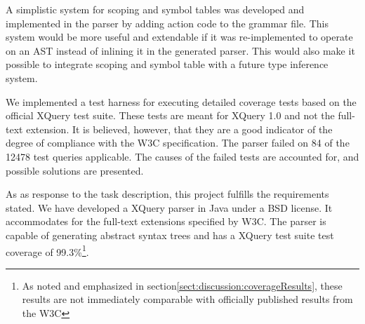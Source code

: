 A simplistic system for scoping and symbol tables was developed and implemented in the parser by adding action code to the grammar file. This system would be more useful and extendable if it was re-implemented to operate on an AST instead of inlining it in the generated parser. This would also make it possible to integrate scoping and symbol table with a future type inference system.

We implemented a test harness for executing detailed coverage tests based on
the official XQuery test suite\cite{w3c05}. These tests are meant for XQuery
1.0 and not the full-text extension. It is believed, however, that they are a
good indicator of the degree of compliance with the W3C specification. The parser
failed on 84 of the 12478 test queries applicable. The causes of the failed tests are accounted for, and possible solutions are presented.

As as response to the task description, this project fulfills the requirements stated. We have developed a XQuery parser in Java under a BSD license. It accommodates for the full-text extensions specified by W3C. The parser is capable of generating abstract syntax trees and has a XQuery test suite test coverage of 99.3\%\footnote{As noted and emphasized in section\ref{sect:discussion:coverageResults}, these results are not immediately comparable with officially published results from the W3C}.
